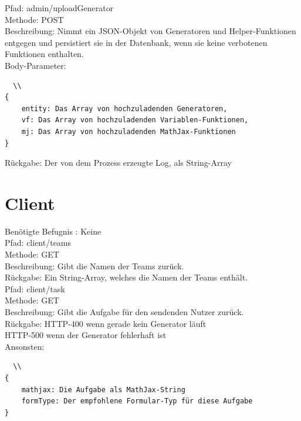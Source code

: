 \noindent Pfad: admin/uploadGenerator \\
Methode: POST \\
Beschreibung: Nimmt ein JSON-Objekt von Generatoren und Helper-Funktionen entgegen und persistiert sie in der Datenbank, wenn sie keine verbotenen Funktionen enthalten. \\
Body-Parameter:\begin{lstlisting}  \\
{
	entity: Das Array von hochzuladenden Generatoren,
	vf: Das Array von hochzuladenden Variablen-Funktionen,
	mj: Das Array von hochzuladenden MathJax-Funktionen
}
\end{lstlisting}
Rückgabe: Der von dem Prozess erzeugte Log, als String-Array \\

\section{Client}

Benötigte Befugnis : Keine \\

\noindent Pfad: client/teams \\
Methode: GET \\
Beschreibung: Gibt die Namen der Teams zurück. \\
Rückgabe: Ein String-Array, welches die Namen der Teams enthält. \\

\noindent Pfad: client/task \\
Methode: GET \\
Beschreibung: Gibt die Aufgabe für den sendenden Nutzer zurück. \\
Rückgabe: HTTP-400 wenn gerade kein Generator läuft \\
HTTP-500 wenn der Generator fehlerhaft ist \\
Ansonsten: \begin{lstlisting}  \\
{
	mathjax: Die Aufgabe als MathJax-String
	formType: Der empfohlene Formular-Typ für diese Aufgabe
}
\end{lstlisting}

